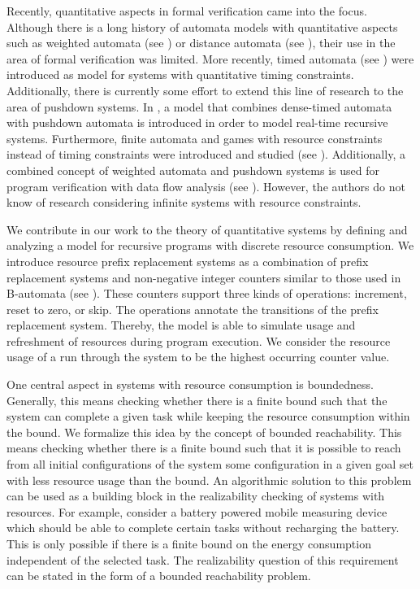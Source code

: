 \documentclass{LMCS}
\begin{document}
Recently, quantitative aspects in formal verification came into the focus.
Although there is a long history of automata models with quantitative aspects
such as weighted automata (see \cite{Schutzenberger-WeightedAutomata}) or
distance automata (see \cite{distanceAutomata}), their use in the area of formal
verification was limited. More recently, timed automata (see
\cite{Alur-timedAutomata}) were introduced as model for systems with
quantitative timing constraints. Additionally, there is currently some effort to
extend this line of research to the area of pushdown systems. In
\cite{timed-pushdown}, a model that combines dense-timed automata with pushdown
automata is introduced in order to model real-time recursive systems. Furthermore,
finite automata and games with resource constraints instead of timing
constraints were introduced and studied (see
\cite{infinite-runs-in-weighted-timed-automata}). Additionally, a combined
concept of weighted automata and pushdown systems is used for program
verification with data flow analysis (see \cite{Lal-TACAS08}). However, the
authors do not know of research considering infinite systems with resource
constraints. 


We contribute in our work to the theory of quantitative systems by defining and
analyzing a model for recursive programs with discrete resource consumption. We
introduce resource prefix replacement systems as a combination of prefix
replacement systems and non-negative integer counters similar to those used in B-automata (see
\cite{regularcostfunctions}). These counters support three kinds of operations:
increment, reset to zero, or skip. The operations annotate the
transitions of the prefix replacement system. Thereby, the model is able to
simulate usage and refreshment of resources during program execution. We
consider the resource usage of a run through the system to be the highest
occurring counter value. 


One central aspect in systems with resource consumption is boundedness.
Generally, this means checking whether there is a finite bound such that the
system can complete a given task while keeping the resource consumption within
the bound. We formalize this idea by the concept of bounded reachability. This
means checking whether there is a finite bound such that it is possible to reach
from all initial configurations of the system some configuration in a given goal
set with less resource usage than the bound. An algorithmic solution to this
problem can be used as a building block in the realizability checking of systems
with resources. For example, consider a battery powered mobile measuring device
which should be able to complete certain tasks without recharging the battery.
This is only possible if there is a finite bound on the energy consumption
independent of the selected task. The realizability question of this requirement
can be stated in the form of a bounded reachability problem.
\end{document}
